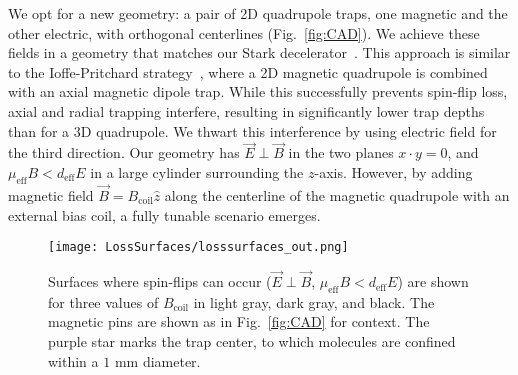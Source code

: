 \documentclass[%
 reprint,
 amsmath,amssymb,
 aps,
prl,
]{revtex4-1}
\newcommand{\bcl}{{$B_\text{coil}$}}
\newcommand{\epb}{{$\vec{E}\!\perp\!\vec{B}$}}
\begin{document}
We opt for a new geometry: a pair of 2D quadrupole traps, one magnetic and the other electric, with orthogonal centerlines (Fig.~\ref{fig:CAD}). We achieve these fields in a geometry that matches our Stark decelerator~\cite{Bochinski2003}. This approach is similar to the Ioffe-Pritchard strategy~\cite{pritchard1983}, where a 2D magnetic quadrupole is combined with an axial magnetic dipole trap. While this successfully prevents spin-flip loss, axial and radial trapping interfere, resulting in significantly lower trap depths than for a 3D quadrupole. We thwart this interference by using electric field for the third direction. Our geometry has \epb{} in the two planes $x\cdot y=0$, and $\mu_\text{eff}B < d_\text{eff}E$ in a large cylinder surrounding the $z$-axis. However, by adding magnetic field $\vec{B}=B_\text{coil}\hat{z}$ along the centerline of the magnetic quadrupole with an external bias coil, a fully tunable scenario emerges. %


\begin{figure}[tb]
\texttt{[image: LossSurfaces/losssurfaces\_out.png]}%
\caption{
Surfaces where spin-flips can occur (\epb{}, $\mu_\text{eff}B<d_\text{eff}E$) are shown for three values of \bcl{} in light gray, dark gray, and black. The magnetic pins are shown as in Fig.~\ref{fig:CAD} for context. The purple star marks the trap center, to which molecules are confined within a \raisebox{2.5px}{\texttildelow} $\!\!1\text{ mm}$ diameter.}
\label{fig:LSurfs}
\end{figure}
\end{document}
